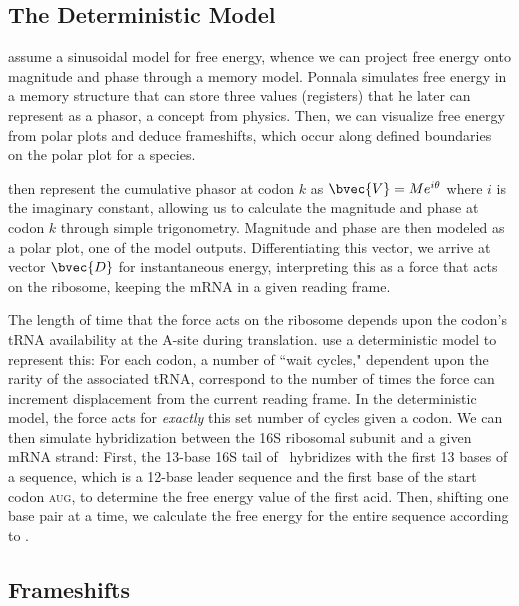 \documentclass[12pt]{article}
\numberwithin{equation}{section}
\begin{document}
\subsection{The Deterministic Model}
\citet{lalit:mechanics} assume a sinusoidal model for
free energy, whence we can project free energy onto magnitude and
phase through a memory model. Ponnala simulates free
energy in a memory structure that can store three values (registers)
that he later can represent as a phasor, a concept from physics. Then,
we can visualize free energy from polar plots and deduce frameshifts,
which occur along defined boundaries~\citet{lalit:mechanics} on the polar plot for a species.
 
\citet{lalit:embs} then represent the cumulative phasor
at codon $k$ as $\bvec{V} = Me^{i\theta}$ where $i$ is the imaginary
constant, allowing us to calculate the magnitude and phase at codon
$k$ through simple trigonometry. Magnitude and phase are then modeled
as a polar plot, one of the model outputs. Differentiating this vector, we
arrive at vector $\bvec{D}$ for instantaneous energy, interpreting
this as a force that acts on the ribosome, keeping the mRNA in
a given reading frame.
 
The length of time that the force acts on the ribosome depends upon
the codon's tRNA availability at the A-site during translation.
\citeauthor{lalit:mechanics} use a deterministic model to represent this: For each codon,
a number of ``wait cycles," dependent upon the rarity of the
associated tRNA, correspond to the number of times the force can
increment displacement from the current reading frame.  In the
deterministic model, the force acts for \emph{exactly} this set number
of cycles given a codon. We can then simulate hybridization between the
16S ribosomal subunit and a given mRNA strand: First, the 13-base 16S
tail of \ecoli\ hybridizes with the first 13 bases of a sequence,
which is a 12-base leader sequence and the first base of the start
codon \textsc{aug}, to determine the free energy value of the first acid.
Then, shifting one base pair at a time, we calculate the free energy
for the entire sequence according to \citet{starmer}.

\subsection{Frameshifts}
\label{section:frameshifts}
\end{document}
